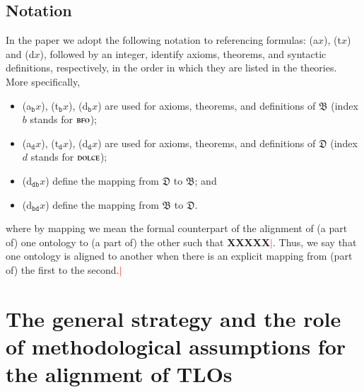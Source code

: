 \documentclass[ao]{iosart2x}
\newcommand{\nb}[1]{\textcolor{red}{$|$}\marginpar{\hspace*{-0cm}\parbox{20mm}{\scriptsize\raggedright\textcolor{red}{#1}}}}
\newcommand{\bfoAxLabel}{\textrm{a$_\texttt{b}$}}
\newcommand{\bfoDefLabel}{\textrm{d$_\texttt{b}$}}
\newcommand{\bfoThrLabel}{\textrm{t$_\texttt{b}$}}
\newcommand{\dolceAxLabel}{\textrm{a$_\texttt{d}$}}
\newcommand{\dolceDefLabel}{\textrm{d$_\texttt{d}$}}
\newcommand{\dolceThrLabel}{\textrm{t$_\texttt{d}$}}
\newcommand{\dbDefLabel}{\textrm{d$_\texttt{db}$}}
\newcommand{\dbThrLabel}{\textrm{t$_\texttt{db}$}}
\newcommand{\dbAxLabel}{\textrm{a}$_\texttt{db}$}
\newcommand{\bdDefLabel}{\textrm{d$_\texttt{bd}$}}
\newcommand{\bdThrLabel}{\textrm{t$_\texttt{bd}$}}
\newcommand{\bdAxLabel}{\textrm{a}$_\texttt{bd}$}
\newcommand{\dolce}{{\textsc{dolce}}}
\newcommand{\bfo}{{\textsc{bfo}}}
\newcommand {\thdolce} {\ensuremath{\mathfrak{D}}}
\newcommand {\thbfo} {\ensuremath{\mathfrak{B}}}
\begin{document}
\subsection{Notation}
In the paper we adopt the following notation to referencing formulas: ({\rm a}$x$), ({\rm t}$x$) and ({\rm d}$x$), followed by an integer, identify axioms, theorems, and syntactic definitions, respectively, in the order in which they are listed in the theories. More specifically,
\begin{itemize}
\item (\bfoAxLabel $x$), (\bfoThrLabel $x$), (\bfoDefLabel $x$) are used for axioms, theorems, and definitions of $\thbfo$ (index $b$ stands for $\bfo$); 
\item (\dolceAxLabel $x$), (\dolceThrLabel $x$), (\dolceDefLabel $x$) are used for axioms, theorems, and definitions of {$\thdolce$} (index $d$ stands for $\dolce$); 
\item %
(\dbDefLabel $x$) define %
the mapping  from ${\thdolce}$ to ${\thbfo}$; and
\item %
(\bdDefLabel $x$) define %
the mapping  from ${\thbfo}$ to ${\thdolce}$.  
\end{itemize}
where by mapping we mean the formal counterpart of the alignment of (a part of) one ontology to (a part of) the other such that {\bf XXXXX}\nb{SB: qui serve una spiegazione di qualche riga su cosa intendiamo con il termine alignment (che usiamo in modo informale) e mapping (che usiamo in modo formale), bisogna almeno dare l'intuizione}. Thus, we say that one ontology is aligned to another when there is an explicit mapping from (part of) the first to the second.\nb{controllare!!}

\section{The general strategy and the role of methodological assumptions for the alignment of TLOs}\label{sect_methodology}

\end{document}
